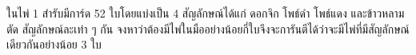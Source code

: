 ﻿%
\question ในไพ่ 1 สำรับมีการ์ด 52 ใบโดยแบ่งเป็น 4 สัญลักษณ์ได้แก่ ดอกจิก โพธ์ดำ โพธ์แดง และข้าวหลามตัด สัญลักษณ์ละเท่า ๆ กัน จงหาว่าต้องมีไพ่ในมืออย่างน้อยกี่ใบจึงจะการันตีได้ว่าจะมีไพ่ที่มีสัญลักษณ์เดียวกันอย่างน้อย 3 ใบ
\newline
{}
